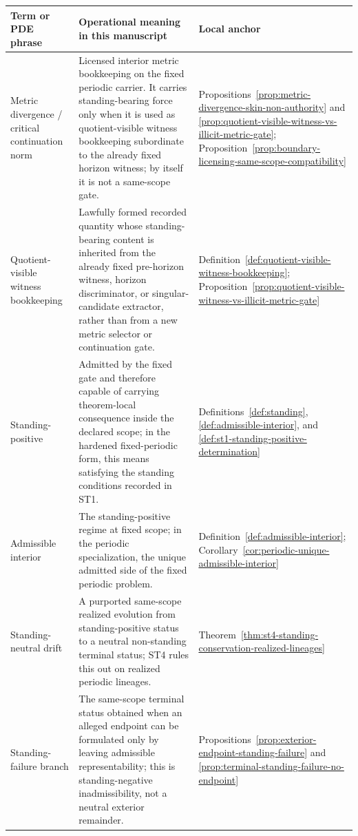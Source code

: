 \begin{tcolorbox}[title={Compact glossary and PDE-language crosswalk (continued)}, colback=green!2!white, colframe=green!45!black, boxsep=1pt, left=2pt, right=2pt, top=2pt, bottom=2pt]
\scriptsize
\renewcommand{\arraystretch}{1.05}
\setlength{\tabcolsep}{2.8pt}
\begin{tabularx}{\textwidth}{@{}L{0.22\textwidth}L{0.35\textwidth}Y@{}}
\toprule
\textbf{Term or PDE phrase} & \textbf{Operational meaning in this manuscript} & \textbf{Local anchor}\\
\midrule
Metric divergence / critical continuation norm & Licensed interior metric bookkeeping on the fixed periodic carrier. It carries standing-bearing force only when it is used as quotient-visible witness bookkeeping subordinate to the already fixed horizon witness; by itself it is not a same-scope gate. & Propositions~\ref{prop:metric-divergence-skin-non-authority} and \ref{prop:quotient-visible-witness-vs-illicit-metric-gate}; Proposition~\ref{prop:boundary-licensing-same-scope-compatibility}\\
Quotient-visible witness bookkeeping & Lawfully formed recorded quantity whose standing-bearing content is inherited from the already fixed pre-horizon witness, horizon discriminator, or singular-candidate extractor, rather than from a new metric selector or continuation gate. & Definition~\ref{def:quotient-visible-witness-bookkeeping}; Proposition~\ref{prop:quotient-visible-witness-vs-illicit-metric-gate}\\
Standing-positive & Admitted by the fixed gate and therefore capable of carrying theorem-local consequence inside the declared scope; in the hardened fixed-periodic form, this means satisfying the standing conditions recorded in ST1. & Definitions~\ref{def:standing}, \ref{def:admissible-interior}, and \ref{def:st1-standing-positive-determination}\\
Admissible interior & The standing-positive regime at fixed scope; in the periodic specialization, the unique admitted side of the fixed periodic problem. & Definition~\ref{def:admissible-interior}; Corollary~\ref{cor:periodic-unique-admissible-interior}\\
Standing-neutral drift & A purported same-scope realized evolution from standing-positive status to a neutral non-standing terminal status; ST4 rules this out on realized periodic lineages. & Theorem~\ref{thm:st4-standing-conservation-realized-lineages}\\
Standing-failure branch & The same-scope terminal status obtained when an alleged endpoint can be formulated only by leaving admissible representability; this is standing-negative inadmissibility, not a neutral exterior remainder. & Propositions~\ref{prop:exterior-endpoint-standing-failure} and \ref{prop:terminal-standing-failure-no-endpoint}\\

\end{tabularx}
\end{tcolorbox}
